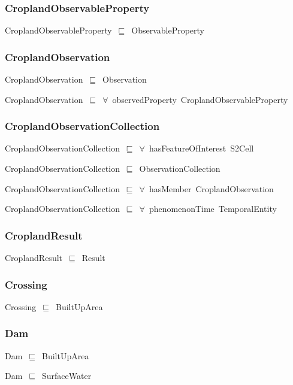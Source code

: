 \documentclass{article}
\begin{document}
\subsubsection*{CroplandObservableProperty}

CroplandObservableProperty~\ensuremath{\sqsubseteq}~ObservableProperty~

\subsubsection*{CroplandObservation}

CroplandObservation~\ensuremath{\sqsubseteq}~Observation~

CroplandObservation~\ensuremath{\sqsubseteq}~\ensuremath{\forall}~observedProperty~CroplandObservableProperty~

\subsubsection*{CroplandObservationCollection}

CroplandObservationCollection~\ensuremath{\sqsubseteq}~\ensuremath{\forall}~hasFeatureOfInterest~S2Cell~

CroplandObservationCollection~\ensuremath{\sqsubseteq}~ObservationCollection~

CroplandObservationCollection~\ensuremath{\sqsubseteq}~\ensuremath{\forall}~hasMember~CroplandObservation~

CroplandObservationCollection~\ensuremath{\sqsubseteq}~\ensuremath{\forall}~phenomenonTime~TemporalEntity~

\subsubsection*{CroplandResult}

CroplandResult~\ensuremath{\sqsubseteq}~Result~

\subsubsection*{Crossing}

Crossing~\ensuremath{\sqsubseteq}~BuiltUpArea~

\subsubsection*{Dam}

Dam~\ensuremath{\sqsubseteq}~BuiltUpArea~

Dam~\ensuremath{\sqsubseteq}~SurfaceWater~
\end{document}
